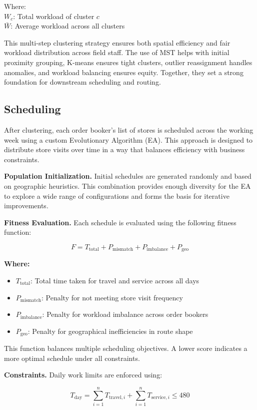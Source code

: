 Where: \\
$W_c$: Total workload of cluster $c$ \\
$\bar{W}$: Average workload across all clusters

This multi-step clustering strategy ensures both spatial efficiency and fair workload distribution across field staff. The use of MST helps with initial proximity grouping, K-means ensures tight clusters, outlier reassignment handles anomalies, and workload balancing ensures equity. Together, they set a strong foundation for downstream scheduling and routing.

\subsection{Scheduling}

After clustering, each order booker’s list of stores is scheduled across the working week using a custom Evolutionary Algorithm (EA). This approach is designed to distribute store visits over time in a way that balances efficiency with business constraints.

\textbf{Population Initialization.} Initial schedules are generated randomly and based on geographic heuristics. This combination provides enough diversity for the EA to explore a wide range of configurations and forms the basis for iterative improvements.

\textbf{Fitness Evaluation.} Each schedule is evaluated using the following fitness function:

\[
F = T_{\text{total}} + P_{\text{mismatch}} + P_{\text{imbalance}} + P_{\text{geo}}
\]

\textbf{Where:}
\begin{itemize}
  \item $T_{\text{total}}$: Total time taken for travel and service across all days
  \item $P_{\text{mismatch}}$: Penalty for not meeting store visit frequency
  \item $P_{\text{imbalance}}$: Penalty for workload imbalance across order bookers
  \item $P_{\text{geo}}$: Penalty for geographical inefficiencies in route shape
\end{itemize}
This function balances multiple scheduling objectives. A lower score indicates a more optimal schedule under all constraints.

\textbf{Constraints.} Daily work limits are enforced using:

\[
T_{\text{day}} = \sum_{i=1}^{n} T_{\text{travel},i} + \sum_{i=1}^{n} T_{\text{service},i} \leq 480
\]


